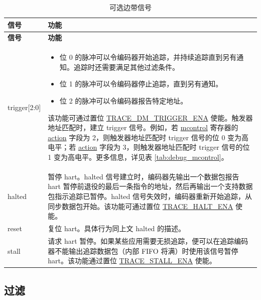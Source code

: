 \documentclass[main\_\_CN.tex]{subfiles}
\begin{document}
\begin{longtable}[c]{ |l|L{12cm}| }
    \caption{可选边带信号}
    \label{tab:sideband_signal}
    \\\hline{}
    \textbf{信号} & \textbf{功能}  \\\hline
    \endfirsthead
     \textbf{信号} & \textbf{功能}  \\\hline
    \endhead
    \endfoot
    \endlastfoot

    trigger[2:0] &
        \begin{itemize}
            \item 位 0 的脉冲可以令编码器开始追踪，并持续追踪直到另有通知。追踪时还需要满足其他过滤条件。
            \item 位 1 的脉冲可以令编码器停止追踪，直到另有通知。
            \item 位 2 的脉冲可以令编码器报告特定地址。
        \end{itemize}
        该功能可通过置位 \hyperref[fielddesc:TRACEDMTRIGGERENA]{TRACE\_DM\_TRIGGER\_ENA} 使能。触发器地址匹配时，建立 trigger 信号。例如，若 \hyperref[regdesc:MCONTROL]{mcontrol} 寄存器的 \hyperref[fielddesc:MCONTROLACTION]{action} 字段为 2，则触发器地址匹配时 trigger 信号的位 0 变为高电平；若 \hyperref[fielddesc:MCONTROLACTION]{action} 字段为 3，则触发器地址匹配时 trigger 信号的位 1 变为高电平。更多信息，详见表 \ref{tab:debug_mcontrol}。\\\hline

    halted & 暂停 hart。halted 信号建立时，编码器先输出一个数据包报告 hart 暂停前退役的最后一条指令的地址，然后再输出一个支持数据包指示追踪已暂停。halted 信号失效时，编码器重新开始追踪，从同步数据包开始。该功能可通过置位 \hyperref[fielddesc:TRACEHALTENA]{TRACE\_HALT\_ENA} 使能。 \\\hline

    reset & 复位 hart。具体行为同上文 halted 的描述。
    \\\hline

    stall & 请求 hart 暂停。如果某些应用需要无损追踪，便可以在追踪编码器不能输出追踪数据包（内部 FIFO 将满）时使用该信号暂停 hart。该功能通过置位 \hyperref[fielddesc:TRACESTALLENA]{TRACE\_STALL\_ENA} 使能。\\\hline

\end{longtable}



\subsection{过滤}\label{sec:riscvtracenc-filter}
\end{document}
